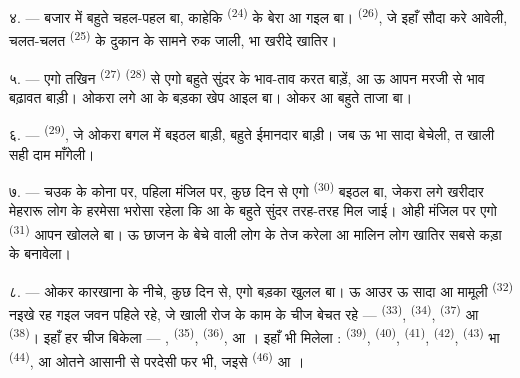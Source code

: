 \VUsaut{4.0mm}
\VUsaut{3.0mm}

४. --- बजार में बहुते चहल-पहल बा, काहेकि 
\textsuperscript{(24)} के बेरा आ गइल बा। 
\textsuperscript{(26)}, जे इहाँ सौदा करे आवेली, चलत-चलत  \textsuperscript{(25)} के दुकान के सामने रुक जाली,  भा
 खरीदे खातिर।

५. --- एगो तखिन  \textsuperscript{(27)}  \textsuperscript{(28)} से एगो बहुते सुंदर  के भाव-ताव
करत बाड़ें, आ ऊ आपन मरजी से भाव बढ़ावत बाड़ी। ओकरा लगे  आ  के बड़का खेप आइल बा। ओकर  आ
 बहुते ताजा बा।

\VUsaut{4.0mm}
\VUsaut{3.0mm}

६. ---  \textsuperscript{(29)}, जे ओकरा बगल में
बइठल बाड़ी, बहुते ईमानदार बाड़ी। जब ऊ  भा सादा
 बेचेली, त खाली सही दाम माँगेली।

७. --- चउक के कोना पर, पहिला मंजिल पर, कुछ दिन से एगो  \textsuperscript{(30)} बइठल बा, जेकरा लगे खरीदार मेहरारू लोग
के हरमेसा भरोसा रहेला कि  आ
 के बहुते सुंदर तरह-तरह मिल जाई। ओही मंजिल पर एगो
 \textsuperscript{(31)} आपन  खोलले
बा। ऊ छाजन के बेचे वाली लोग के  तेज करेला आ मालिन लोग
खातिर सबसे कड़ा  के  बनावेला।

\VUsaut{4.0mm}
\VUsaut{3.0mm}

८. --- ओकर कारखाना के नीचे, कुछ दिन से, एगो बड़का  खुलल बा। ऊ आउर ऊ सादा आ मामूली 
\textsuperscript{(32)} नइखे रह गइल जवन पहिले रहे, जे खाली रोज के काम के
चीज बेचत रहे —  \textsuperscript{(33)}, 
\textsuperscript{(34)},  \textsuperscript{(37)} आ
 \textsuperscript{(38)}। इहाँ हर चीज बिकेला —
,  \textsuperscript{(35)},
 \textsuperscript{(36)},  आ । इहाँ  भी मिलेला :
 \textsuperscript{(39)},  \textsuperscript{(40)},
 \textsuperscript{(41)},  \textsuperscript{(42)},
 \textsuperscript{(43)} भा 
\textsuperscript{(44)}, आ ओतने आसानी से परदेसी फर भी, जइसे 
\textsuperscript{(46)} आ ।


